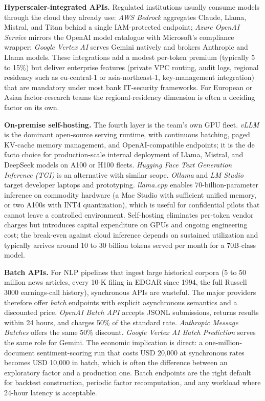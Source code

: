 \textbf{Hyperscaler-integrated APIs.} Regulated institutions usually consume models through the cloud they already use: \textit{AWS Bedrock} aggregates Claude, Llama, Mistral, and Titan behind a single IAM-protected endpoint; \textit{Azure OpenAI Service} mirrors the OpenAI model catalogue with Microsoft's compliance wrapper; \textit{Google Vertex AI} serves Gemini natively and brokers Anthropic and Llama models. These integrations add a modest per-token premium (typically 5 to 15\%) but deliver enterprise features (private VPC routing, audit logs, regional residency such as eu-central-1 or asia-northeast-1, key-management integration) that are mandatory under most bank IT-security frameworks. For European or Asian factor-research teams the regional-residency dimension is often a deciding factor on its own.

\textbf{On-premise self-hosting.} The fourth layer is the team's own GPU fleet. \textit{vLLM} \citep{kwon2023pagedattention} is the dominant open-source serving runtime, with continuous batching, paged KV-cache memory management, and OpenAI-compatible endpoints; it is the de facto choice for production-scale internal deployment of Llama, Mistral, and DeepSeek models on A100 or H100 fleets. \textit{Hugging Face Text Generation Inference (TGI)} is an alternative with similar scope. \textit{Ollama} and \textit{LM Studio} target developer laptops and prototyping. \textit{llama.cpp} enables 70-billion-parameter inference on commodity hardware (a Mac Studio with sufficient unified memory, or two A100s with INT4 quantization), which is useful for confidential pilots that cannot leave a controlled environment. Self-hosting eliminates per-token vendor charges but introduces capital expenditure on GPUs and ongoing engineering cost; the break-even against cloud inference depends on sustained utilization and typically arrives around 10 to 30 billion tokens served per month for a 70B-class model.

\textbf{Batch APIs.} For NLP pipelines that ingest large historical corpora (5 to 50 million news articles, every 10-K filing in EDGAR since 1994, the full Russell 3000 earnings-call history), synchronous APIs are wasteful. The major providers therefore offer \textit{batch} endpoints with explicit asynchronous semantics and a discounted price. \textit{OpenAI Batch API} accepts JSONL submissions, returns results within 24 hours, and charges 50\% of the standard rate. \textit{Anthropic Message Batches} offers the same 50\% discount. \textit{Google Vertex AI Batch Prediction} serves the same role for Gemini. The economic implication is direct: a one-million-document sentiment-scoring run that costs USD 20,000 at synchronous rates becomes USD 10,000 in batch, which is often the difference between an exploratory factor and a production one. Batch endpoints are the right default for backtest construction, periodic factor recomputation, and any workload where 24-hour latency is acceptable.

